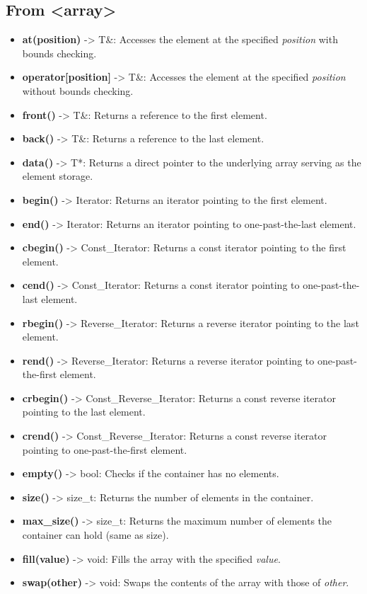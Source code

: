 \documentclass{report}
\begin{document}
    \pagebreak \bigbreak \noindent 
    \subsection{From <array>}
    \begin{itemize}
        \item \textbf{at(position)} -> T\&: Accesses the element at the specified \textit{position} with bounds checking.
        \item \textbf{operator[position]} -> T\&: Accesses the element at the specified \textit{position} without bounds checking.
        \item \textbf{front()} -> T\&: Returns a reference to the first element.
        \item \textbf{back()} -> T\&: Returns a reference to the last element.
        \item \textbf{data()} -> T*: Returns a direct pointer to the underlying array serving as the element storage.
        \item \textbf{begin()} -> Iterator: Returns an iterator pointing to the first element.
        \item \textbf{end()} -> Iterator: Returns an iterator pointing to one-past-the-last element.
        \item \textbf{cbegin()} -> Const\_Iterator: Returns a const iterator pointing to the first element.
        \item \textbf{cend()} -> Const\_Iterator: Returns a const iterator pointing to one-past-the-last element.
        \item \textbf{rbegin()} -> Reverse\_Iterator: Returns a reverse iterator pointing to the last element.
        \item \textbf{rend()} -> Reverse\_Iterator: Returns a reverse iterator pointing to one-past-the-first element.
        \item \textbf{crbegin()} -> Const\_Reverse\_Iterator: Returns a const reverse iterator pointing to the last element.
        \item \textbf{crend()} -> Const\_Reverse\_Iterator: Returns a const reverse iterator pointing to one-past-the-first element.
        \item \textbf{empty()} -> bool: Checks if the container has no elements.
        \item \textbf{size()} -> size\_t: Returns the number of elements in the container.
        \item \textbf{max\_size()} -> size\_t: Returns the maximum number of elements the container can hold (same as size).
        \item \textbf{fill(value)} -> void: Fills the array with the specified \textit{value}.
        \item \textbf{swap(other)} -> void: Swaps the contents of the array with those of \textit{other}.
    \end{itemize}

    

%
%
%

    
\end{document}
